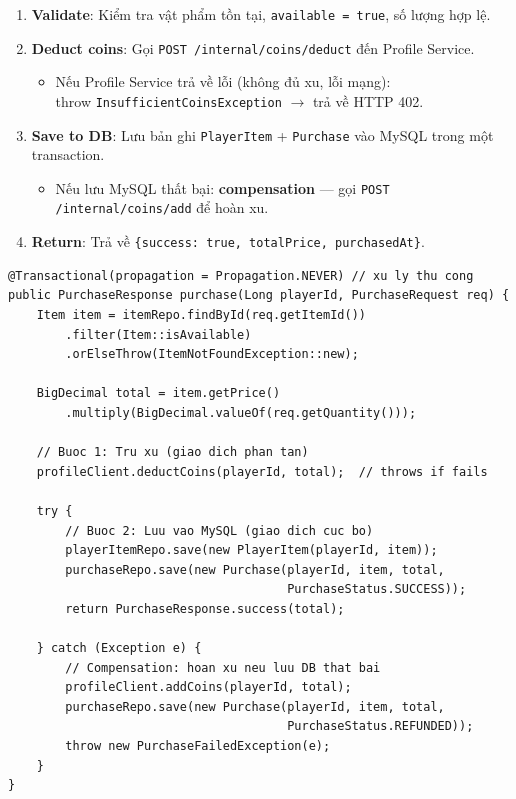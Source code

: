 \documentclass[12pt,a4paper]{report}
\begin{document}
\begin{enumerate}
  \item \textbf{Validate}: Kiểm tra vật phẩm tồn tại, \texttt{available = true}, số lượng hợp lệ.
  \item \textbf{Deduct coins}: Gọi \texttt{POST /internal/coins/deduct} đến Profile Service.
    \begin{itemize}
      \item Nếu Profile Service trả về lỗi (không đủ xu, lỗi mạng): \\
            throw \texttt{InsufficientCoinsException}
            $\rightarrow$ trả về HTTP 402.
    \end{itemize}
  \item \textbf{Save to DB}: Lưu bản ghi \texttt{PlayerItem} + \texttt{Purchase} vào MySQL trong một transaction.
    \begin{itemize}
      \item Nếu lưu MySQL thất bại: \textbf{compensation} --- gọi \texttt{POST /internal/coins/add} để hoàn xu.
    \end{itemize}
  \item \textbf{Return}: Trả về \texttt{\{success: true, totalPrice, purchasedAt\}}.
\end{enumerate}

\begin{lstlisting}[style=javaStyle, caption={Triển khai Saga Pattern trong luồng mua hàng}, label={lst:shopservice}]
@Transactional(propagation = Propagation.NEVER) // xu ly thu cong
public PurchaseResponse purchase(Long playerId, PurchaseRequest req) {
    Item item = itemRepo.findById(req.getItemId())
        .filter(Item::isAvailable)
        .orElseThrow(ItemNotFoundException::new);

    BigDecimal total = item.getPrice()
        .multiply(BigDecimal.valueOf(req.getQuantity()));

    // Buoc 1: Tru xu (giao dich phan tan)
    profileClient.deductCoins(playerId, total);  // throws if fails

    try {
        // Buoc 2: Luu vao MySQL (giao dich cuc bo)
        playerItemRepo.save(new PlayerItem(playerId, item));
        purchaseRepo.save(new Purchase(playerId, item, total,
                                       PurchaseStatus.SUCCESS));
        return PurchaseResponse.success(total);

    } catch (Exception e) {
        // Compensation: hoan xu neu luu DB that bai
        profileClient.addCoins(playerId, total);
        purchaseRepo.save(new Purchase(playerId, item, total,
                                       PurchaseStatus.REFUNDED));
        throw new PurchaseFailedException(e);
    }
}
\end{lstlisting}
\end{document}
